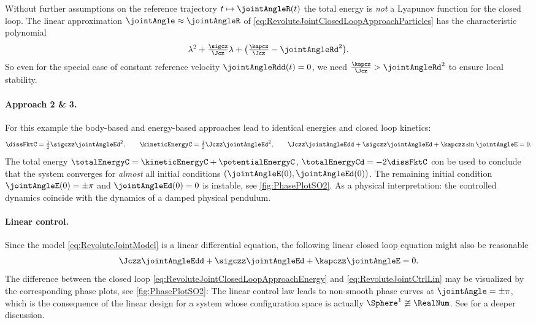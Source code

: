 Without further assumptions on the reference trajectory $t \mapsto \jointAngleR(t)$ the total energy is \textit{not} a Lyapunov function for the closed loop.
The linear approximation $\jointAngle \approx \jointAngleR$ of \eqref{eq:RevoluteJointClosedLoopApproachParticles} has the characteristic polynomial
\begin{align}
 \lambda^2 + \tfrac{\sigcz}{\Jcz} \lambda + \big( \tfrac{\kapcz}{\Jcz} - \jointAngleRd^2 \big).
\end{align}
So even for the special case of constant reference velocity $\jointAngleRdd(t) = 0$, we need $\tfrac{\kapcz}{\Jcz} > \jointAngleRd^2$ to ensure local stability.

\paragraph{Approach 2 \& 3.}
For this example the body-based and energy-based approaches lead to identical energies and closed loop kinetics:
\begin{align}
 \dissFktC = \tfrac{1}{2} \sigczz \jointAngleEd^2,
\qquad
 \kineticEnergyC = \tfrac{1}{2} \Jczz \jointAngleEd^2,
\qquad
 \Jczz \jointAngleEdd + \sigczz \jointAngleEd + \kapczz \sin \jointAngleE = 0.
\label{eq:RevoluteJointClosedLoopApproachEnergy}
\end{align}
The total energy $\totalEnergyC = \kineticEnergyC + \potentialEnergyC$, $\totalEnergyCd = -2\dissFktC$ con be used to conclude that the system converges for \textit{almost} all initial conditions $(\jointAngleE(0), \jointAngleEd(0))$.
The remaining initial condition $\jointAngleE(0) = \pm\pi$ and $\jointAngleEd(0)=0$ is instable, see \autoref{fig:PhasePlotSO2}.
As a physical interpretation: the controlled dynamics coincide with the dynamics of a damped physical pendulum.

\paragraph{Linear control.}
Since the model \eqref{eq:RevoluteJointModel} is a linear differential equation, the following linear closed loop equation might also be reasonable
\begin{align}\label{eq:RevoluteJointCtrlLin}
 \Jczz \jointAngleEdd + \sigczz \jointAngleEd + \kapczz \jointAngleE = 0.
\end{align}
The difference between the closed loop \eqref{eq:RevoluteJointClosedLoopApproachEnergy} and \eqref{eq:RevoluteJointCtrlLin} may be visualized by the corresponding phase plots, see \autoref{fig:PhasePlotSO2}:
The linear control law leads to non-smooth phase curves at $\jointAngle = \pm\pi$, which is the consequence of the linear design for a system whose configuration space is actually $\Sphere^1 \ncong \RealNum$.
See \cite[sec.\ 1.2]{Konz:AT} for a deeper discussion.

